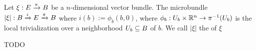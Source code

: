 \begin{myexample}
    Let $\xi: E \xto{\pi} B$ be a $n$-dimensional vector bundle.
    The microbundle $\lvert \xi \rvert: \bundle{B}{E}{i}{\pi}$ where $i(b) := \phi_b(b, 0)$, where
    $\phi_b: U_b \times \R^n \to \pi^{-1}(U_b)$ is the local trivialization over a
    neighborhood $U_b \sub B$ of $b$. We call $\lvert \xi \rvert$ the  of $\xi$
    \begin{myproof}
        TODO
    \end{myproof}
\end{myexample}